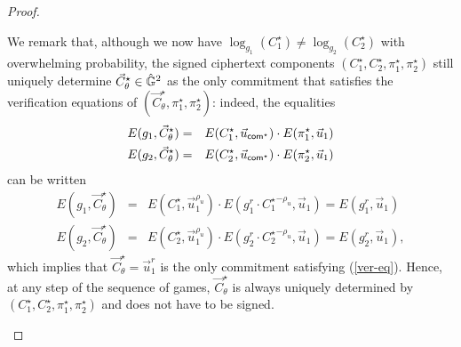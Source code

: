 \begin{proof}
\begin{description}
 We remark that, although we now have  
$\log_{g_1}(C_1^\star) \neq \log_{g_2}(C_2^\star)$ with overwhelming probability, the signed ciphertext components $(C_1^\star,C_2^\star,\pi_1^\star,\pi_2^\star)$ 
 still uniquely determine $\vec{C}_{\theta}^\star \in \hat{\mathbb{G}}^2$ as the only commitment that satisfies the verification equations of 
$(\vec{C}_{\theta}^\star,\pi_1^\star,\pi_2^\star)$:
indeed, the equalities 
\begin{eqnarray*}
E(g_1,\vec{C}_\theta^\star) &=& E(C_1^\star, \vec{u}_{\mathsf{com}^\star}) \cdot E(\pi_1^\star ,\vec{u}_1)  \\ 
E(g_2,\vec{C}_\theta^\star) &=& E(C_2^\star, \vec{u}_{\mathsf{com}^\star}) \cdot E(\pi_2^\star ,\vec{u}_1) 
\end{eqnarray*} 
can be written 
\begin{eqnarray*}
E(g_1,\vec{C}_\theta^\star) &=& E(C_1^\star , \vec{u}_1^{\rho_u} ) 
\cdot E(  g_1^{r} \cdot {C_1^\star }^{-\rho_u} , \vec{u}_1)  = E(g_1^r,\vec{u}_1)  \\
E(g_2,\vec{C}_\theta^\star) &=& E(C_2^\star , \vec{u}_1^{\rho_u} ) 
\cdot E(  g_2^{r} \cdot {C_2^\star }^{-\rho_u} , \vec{u}_1) =E(g_2^r,\vec{u}_1),
\end{eqnarray*}
which implies that $\vec{C}_{\theta}^\star = \vec{u}_1^r$ is the only commitment satisfying (\ref{ver-eq}). Hence, at any step of the sequence of 
games, $\vec{C}_\theta^\star$ 
is always uniquely determined by $(C_1^\star,C_2^\star,\pi_1^\star,\pi_2^\star)$ and does not have to be signed. 
 \smallskip \smallskip

 

\end{description}


\end{proof}
